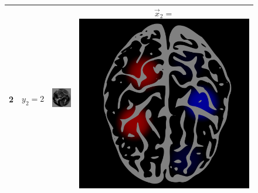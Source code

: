 \begin{figure}
\begin{tabular}{|c|cc|c|}
2 & $y_2 = 2$ & \includegraphics[scale = 0.26]{../../proposal/img4.png} & $\vec{x}_2 = $\includegraphics[scale = 0.035]{../../proposal/brain3.png} \\ \hline

\end{tabular}
\end{figure}
